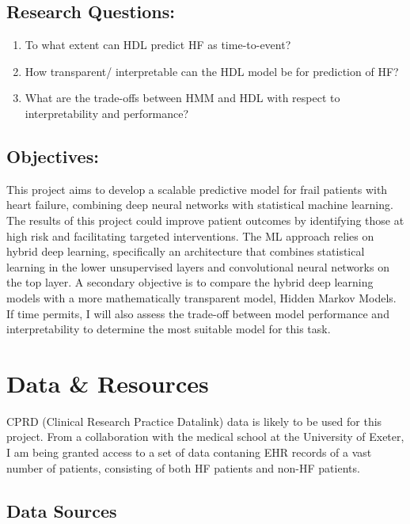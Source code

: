 \documentclass[%
 reprint,
 amsmath,amssymb,
 aps,
 nofootinbib,
]{revtex4-2}
\theoremstyle{definition}
\begin{document}
\subsection{Research Questions:}
\begin{enumerate}
\item To what extent can HDL predict HF as time-to-event?
\item How transparent/ interpretable can the HDL model be for prediction of HF?
\item What are the trade-offs between HMM and HDL with respect to interpretability and performance?
\end{enumerate}

\subsection{Objectives:}

This project aims to develop a scalable predictive model for frail patients with heart failure, combining deep neural networks with statistical machine learning. The results of this project could improve patient outcomes by identifying those at high risk and facilitating targeted interventions. The ML approach relies on hybrid deep learning, specifically an architecture that combines statistical learning in the lower unsupervised layers and convolutional neural networks on the top layer. A secondary objective is to compare the hybrid deep learning models with a more mathematically transparent model, Hidden Markov Models. If time permits, I will also assess the trade-off between model performance and interpretability to determine the most suitable model for this task.

\section{\label{datares}Data \& Resources}
CPRD (Clinical Research Practice Datalink) data is likely to be used for this project. From a collaboration with the medical school at the University of Exeter, I am being granted access to a set of data contaning EHR records of a vast number of patients, consisting of both HF patients and non-HF patients.

\subsection{\label{data}Data Sources}
\end{document}
